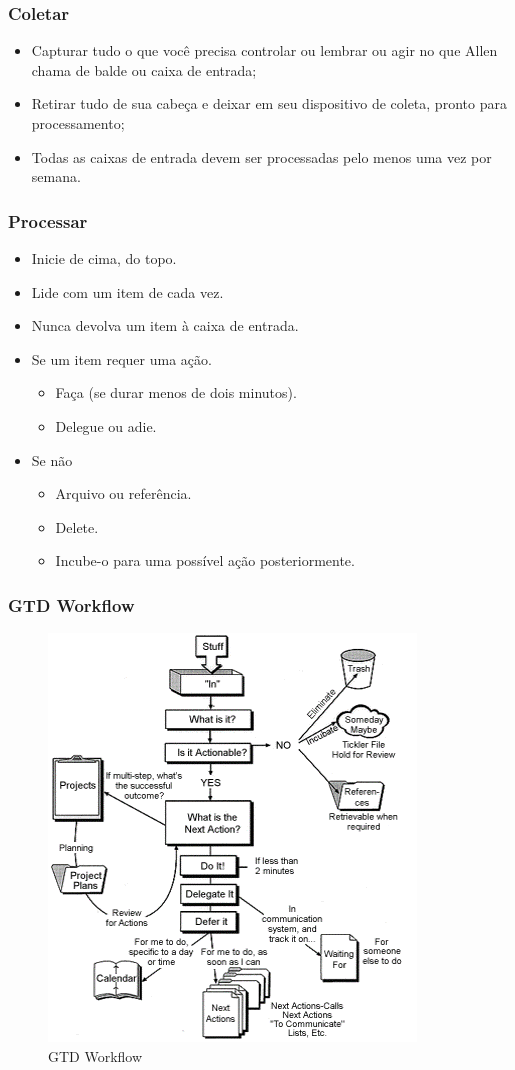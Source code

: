 \documentclass{beamer}
\begin{document}
\begin{frame}[t]\frametitle{Coletar}
	\begin{itemize}
	 	\item Capturar tudo o que você precisa controlar ou lembrar ou agir no que Allen chama de balde ou caixa de entrada;
		\item Retirar tudo de sua cabeça e deixar em seu dispositivo de coleta, pronto para processamento;
		\item Todas as caixas de entrada devem ser processadas pelo menos uma vez por semana.
	 \end{itemize} 
\end{frame}

\begin{frame}[t]\frametitle{Processar}
    \begin{itemize}
    	\item Inicie de cima, do topo.
		\item Lide com um item de cada vez.
		\item Nunca devolva um item à caixa de entrada.
		\item Se um item requer uma ação.
		\begin{itemize}
			\item Faça (se durar menos de dois minutos).
			\item Delegue ou adie.
		\end{itemize}
		\item Se não
		\begin{itemize}
			\item Arquivo ou referência.
			\item Delete.
			\item Incube-o para uma possível ação posteriormente.
		\end{itemize}
    \end{itemize}
\end{frame}

\begin{frame}[t]\frametitle{GTD Workflow}
\begin{figure}[tb]
	\begin{center}
		\includegraphics[width=0.45\linewidth]{img/workflow-gtd.png}
	\end{center}
	\caption{GTD Workflow}
	\label{fig:workflow-gtd}
\end{figure}
\end{frame}
\end{document}
